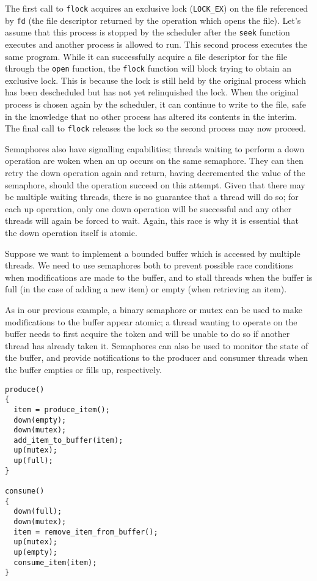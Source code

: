 The first call to \texttt{flock} acquires an exclusive lock
(\texttt{LOCK\_EX}) on the file referenced by \texttt{fd} (the file
descriptor returned by the operation which opens the file).  Let's
assume that this process is stopped by the scheduler after the
\texttt{seek} function executes and another process is allowed to run.
This second process executes the same program.  While it can
successfully acquire a file descriptor for the file through the
\texttt{open} function, the \texttt{flock} function will block trying
to obtain an exclusive lock.  This is because the lock is still held
by the original process which has been descheduled but has not yet
relinquished the lock.  When the original process is chosen again by
the scheduler, it can continue to write to the file, safe in the
knowledge that no other process has altered its contents in the
interim.  The final call to \texttt{flock} releases the lock so the
second process may now proceed.

Semaphores also have signalling capabilities; threads waiting to
perform a down operation are woken when an up occurs on the same
semaphore.  They can then retry the down operation again and return,
having decremented the value of the semaphore, should the operation
succeed on this attempt.  Given that there may be multiple waiting
threads, there is no guarantee that a thread will do so; for each up
operation, only one down operation will be successful and any other
threads will again be forced to wait.  Again, this race is why it is
essential that the down operation itself is atomic.

Suppose we want to implement a bounded buffer which is accessed by
multiple threads.  We need to use semaphores both to prevent possible
race conditions when modifications are made to the buffer, and to
stall threads when the buffer is full (in the case of adding a new
item) or empty (when retrieving an item).

As in our previous example, a binary semaphore or mutex can be used to
make modifications to the buffer appear atomic; a thread wanting to
operate on the buffer needs to first acquire the token and will be
unable to do so if another thread has already taken it.  Semaphores
can also be used to monitor the state of the buffer, and provide
notifications to the producer and consumer threads when the buffer
empties or fills up, respectively.

\begin{verbatim}
produce()
{
  item = produce_item();
  down(empty);
  down(mutex);
  add_item_to_buffer(item);
  up(mutex);
  up(full);
}

consume()
{
  down(full);
  down(mutex);
  item = remove_item_from_buffer();
  up(mutex);
  up(empty);
  consume_item(item);
}
\end{verbatim}

